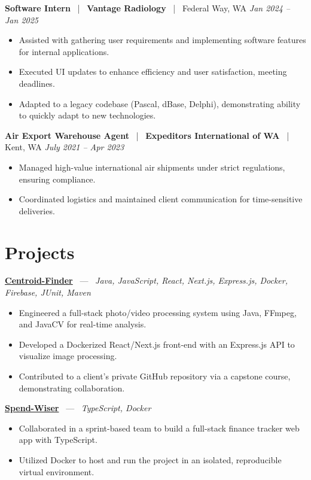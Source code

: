 \documentclass[10pt, letterpaper]{article}
\newcommand{\jobhead}[4]{%
  \vspace{5pt}%
  {\bfseries\color{dark}#1}%
  ~{\color{light}|}~%
  {\bfseries\color{navy}#2}%
  ~{\color{light}|}~%
  {\color{light}#3}%
  \hfill{\color{light}\small\textit{#4}}\\[-2pt]%
}
\newcommand{\projhead}[3]{%
  \vspace{5pt}%
  {\bfseries\color{dark}\href{#2}{#1}}%
  ~{\color{light}---}~%
  {\color{light}\small\textit{#3}}\\[-2pt]%
}
\begin{document}
\jobhead{Software Intern}{Vantage Radiology}{Federal Way, WA}{Jan 2024 – Jan 2025}
\begin{itemize}
  \item Assisted with gathering user requirements and implementing software features for internal applications.
  \item Executed UI updates to enhance efficiency and user satisfaction, meeting deadlines.
  \item Adapted to a legacy codebase (Pascal, dBase, Delphi), demonstrating ability to quickly adapt to new technologies.
\end{itemize}

\jobhead{Air Export Warehouse Agent}{Expeditors International of WA}{Kent, WA}{July 2021 – Apr 2023}
\begin{itemize}
  \item Managed high-value international air shipments under strict regulations, ensuring compliance.
  \item Coordinated logistics and maintained client communication for time-sensitive deliveries.
\end{itemize}

\section{Projects}

\projhead{Centroid-Finder}{https://github.com/xavierb117/centroid-finder}{Java, JavaScript, React, Next.js, Express.js, Docker, Firebase, JUnit, Maven}
\begin{itemize}
  \item Engineered a full-stack photo/video processing system using Java, FFmpeg, and JavaCV for real-time analysis.
  \item Developed a Dockerized React/Next.js front-end with an Express.js API to visualize image processing.
  \item Contributed to a client's private GitHub repository via a capstone course, demonstrating collaboration.
\end{itemize}

\projhead{Spend-Wiser}{https://github.com/JesseChum/w26-sdev372-spendwiser-finance-tracker}{TypeScript, Docker}
\begin{itemize}
  \item Collaborated in a sprint-based team to build a full-stack finance tracker web app with TypeScript.
  \item Utilized Docker to host and run the project in an isolated, reproducible virtual environment.
\end{itemize}
\end{document}

